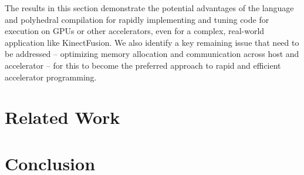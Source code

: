 \documentclass{llncs}
\begin{document}
The results in this section demonstrate the potential advantages
of the \pencil language and polyhedral compilation for rapidly
implementing and tuning code for execution on GPUs or other
accelerators, even for a complex, real-world application like
KinectFusion.
We also identify a key remaining issue that need to be addressed
-- optimizing memory allocation and communication across host
and accelerator -- for this to become the preferred approach to
rapid and efficient accelerator programming.




\section{Related Work}


\section{Conclusion}




\end{document}
